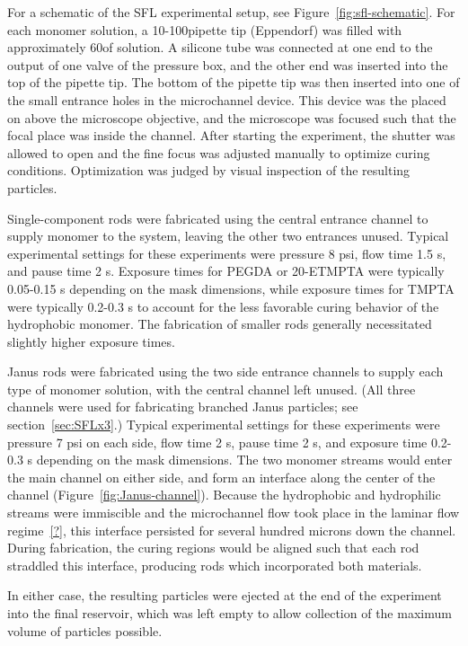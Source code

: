 For a schematic of the SFL experimental setup, see Figure~\ref{fig:sfl-schematic}.
For each monomer solution, a 10-100\uL pipette tip (Eppendorf) was filled with approximately 60\uL of solution.
A silicone tube was connected at one end to the output of one valve of the pressure box, and the other end
was inserted into the top of the pipette tip.  The bottom of the pipette tip was then inserted into one of the
small entrance holes in the microchannel device.  This device was the placed on above the microscope objective,
and the microscope was focused such that the focal place was inside the channel.  After starting the 
experiment, the shutter was allowed to open and the fine focus was adjusted manually to optimize
curing conditions. Optimization was judged by visual inspection of the resulting particles. 

Single-component rods were fabricated using the central entrance channel to supply monomer to the system, 
leaving the other two entrances unused. Typical experimental settings for these experiments were pressure
8 psi, flow time 1.5 s, and pause time 2 s.  Exposure times for PEGDA or 20-ETMPTA were typically 0.05-0.15 s
depending on the mask dimensions, while exposure times for TMPTA were typically 0.2-0.3 s to account for
the less favorable curing behavior of the hydrophobic monomer.  The fabrication of smaller rods generally
necessitated slightly higher exposure times.  

Janus rods were fabricated using the two side entrance channels to supply each type of monomer solution,
with the central channel left unused.  (All three channels were used for fabricating branched Janus particles; see
section~\ref{sec:SFLx3}.)  Typical experimental settings for these experiments were pressure 7 psi on each side, 
flow time 2 s, pause time 2 s, and exposure time 0.2-0.3 s depending on the mask dimensions.
The two monomer streams would enter the main channel on either side, and form
an interface along the center of the channel (Figure~\ref{fig:Janus-channel}). Because the hydrophobic and
hydrophilic streams were immiscible and the microchannel flow took place in the laminar flow regime~\ref{?}, 
this interface persisted for several hundred microns down the channel.
During fabrication, the curing regions would be aligned such that each rod straddled this interface,
producing rods which incorporated both materials.

In either case, the resulting particles were ejected at the end of the experiment into the final reservoir, which
was left empty to allow collection of the maximum volume of particles possible.


